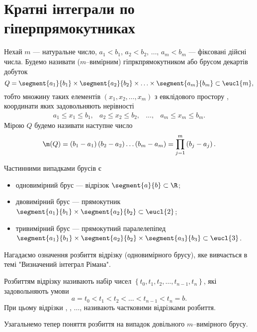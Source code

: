 \section{Кратні інтеграли по гіперпрямокутниках}
\begin{definition}[Гіперпрямокутник]\label{def:box}
Нехай $m$ --- натуральне число, ${a_1<b_1}$, ${a_2 < b_2}$, $\ldots$, ${a_m < b_m}$ --- фіксовані дійсні числа. Будемо називати ($m$--вимірним) гіпркпрямокутником або брусом декартів добуток
\[
Q = \segment{a_1}{b_1}\times\segment{a_2}{b_2}\times\ldots\times\segment{a_m}{b_m} \subset \eucl{m},
\]
тобто множину таких елементів ${\left(x_1, x_2, \ldots, x_m\right)}$ з евклідового простору , координати яких задовольняють нерівності
\[
\begin{array}{cccc}
a_1\leq x_1\leq b_1,&
a_2\leq x_2\leq b_2,&
\ldots,&
a_m\leq x_m\leq b_m.
\end{array}
\]
Мірою $Q$ будемо називати наступне число
\[
\m(Q) = \left(b_1-a_1\right)\left(b_2 - a_2\right)\ldots\left(b_m-a_m\right) = \prod\limits_{j=1}^{m}\left(b_j - a_j\right).
\]
\end{definition}
\begin{example}
Частинними випадками брусів є
\begin{itemize}
\item одновимірний брус --- відрізок ${\segment{a}{b}\subset\R}$;
\item двовимірний брус --- прямокутник ${\segment{a_1}{b_1}\times\segment{a_2}{b_2}\subset\eucl{2}}$;
\item тривимірний брус --- прямокутний паралелепіпед  ${\segment{a_1}{b_1}\times\segment{a_2}{b_2}\times\segment{a_3}{b_3}\subset\eucl{3}}$.
\end{itemize}
\end{example}
Нагадаємо означення розбиття відрізку (одновимірного брусу), яке вивчається в темі "Визначений інтеграл Рімана".
\begin{definition}
Розбиттям відрізку  називають набір чисел ${\left\{t_0, t_1, t_2, \ldots, t_{n-1}, t_{n}\right\}}$, які задовольняють умови
\[
a = t_0 < t_1 < t_2 < \ldots  < t_{n-1} < t_{n} = b.
\]
При цьому відрізки , , ${\ldots}$,  називають частковими відрізками розбиття.

\end{definition}

Узагальнемо тепер поняття розбиття на випадок довільного $m$--вимірного брусу.

